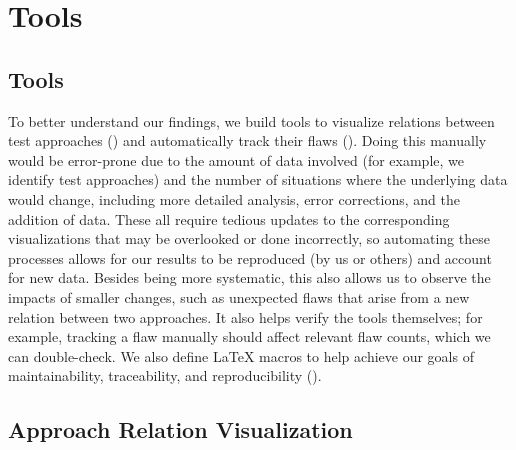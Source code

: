 \ifnotpaper\section{Tools}
\else\subsection{Tools}
\fi\label{tools}

\ifnotpaper
    To better understand our findings, we build tools to
    visualize relations between test approaches () and
    automatically track their flaws (). Doing
    this manually would be error-prone due to the amount of data involved (for
    example, we identify \approachCount{} test approaches) and the number of
    situations where the underlying data would change, including more detailed
    analysis, error corrections, and the addition of data. These all require
    tedious updates to the corresponding visualizations that may be overlooked
    or done incorrectly, so automating these processes allows for our results
    to be reproduced (by us or others) and account for new data. Besides being
    more systematic, this also allows us to observe the impacts of smaller
    changes, such as unexpected flaws that arise from a new relation between
    two approaches. It also helps verify the tools themselves; for example,
    tracking a flaw manually should affect relevant flaw counts, which we can
    double-check. We also define \LaTeX{} macros to help achieve our goals of
    maintainability, traceability, and reproducibility ().

    \subsection{Approach Relation Visualization}\label{app-rel-vis}
\fi

